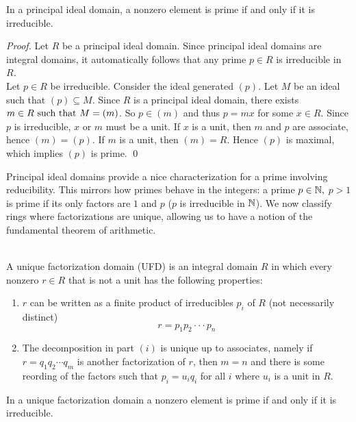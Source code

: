 \begin{proposition}
    In a principal ideal domain, a nonzero element is prime if and only if it is irreducible.
\end{proposition}

\begin{proof}
    Let $R$ be a principal ideal domain. Since principal ideal domains are integral domains, it automatically follows that any prime $p\in R$ is irreducible in $R$. \\
    Let $p\in R$ be irreducible. Consider the ideal generated $(p)$. Let $M$ be an ideal such that $(p) \subseteq M.$ Since $R$ is a principal ideal domain, there exists $m \in R \text{ such that } M = (m)$. So $p \in (m)$ and thus $p=mx$ for some $x \in R$. Since $p$ is irreducible, $x$ or $m$ must be a unit. If $x$ is a unit, then $m$ and $p$ are associate, hence $(m) = (p)$. If $m$ is a unit, then $(m) = R$. Hence $(p)$ is maximal, which implies $(p)$ is prime.
    \qed
\end{proof}

Principal ideal domains provide a nice characterization for a prime involving reducibility. This mirrors how primes behave in the integers: a prime $p\in\mathbb{N},$ $p > 1$ is prime if its only factors are $1$ and $p$ ($p$ is irreducible in $\mathbb{N}$). We now classify rings where factorizations are unique, allowing us to have a notion of the fundamental theorem of arithmetic.

\begin{definition} \leavevmode \\
    A unique factorization domain (UFD) is an integral domain $R$ in which every nonzero $r \in R$ that is not a unit has the following properties:
    \begin{enumerate}
        \item $r$ can be written as a finite product of irreducibles $p_i$ of $R$ (not necessarily distinct)
        $$r = p_1p_2\cdot\cdot\cdot p_n$$
        \item The decomposition in part $(i)$ is unique up to associates, namely if $r=q_1q_2\cdots q_m$ is another factorization of $r$, then $m=n$ and there is some reording of the factors such that $p_i = u_iq_i$ for all $i$ where $u_i$ is a unit in $R$.
    \end{enumerate}
\end{definition}

\begin{proposition}
    In a unique factorization domain a nonzero element is prime if and only if it is irreducible.
\end{proposition}

